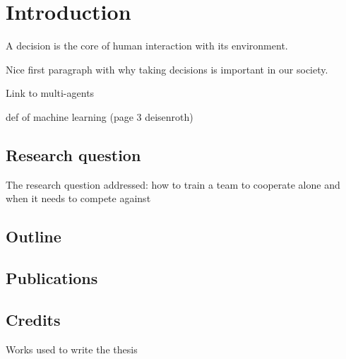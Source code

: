 \chapter{Introduction}\label{ch:introduction}

A decision is the core of human interaction with its environment.

Nice first paragraph with why taking decisions is important in our society.

Link to multi-agents

def of machine learning (page 3 deisenroth)

\section{Research question}
\label{sec:ch1_researchQ}
The research question addressed: how to train a team to cooperate alone and when it needs to compete against 


\section{Outline}
\label{sec:ch1_outline}


\section{Publications}
\label{sec:ch1_public}

\section{Credits}
\label{sec:ch1_credits}
Works used to write the thesis